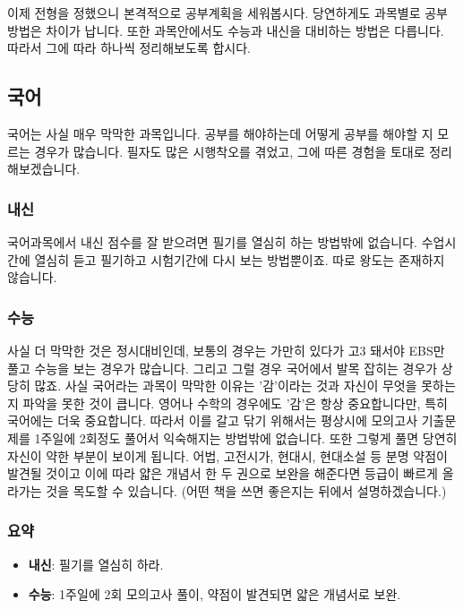 \documentclass[final]{IEEEphot}
\begin{document}
\hspace{0.3cm} 이제 전형을 정했으니 본격적으로 공부계획을 세워봅시다. 당연하게도 과목별로 공부방법은 차이가 납니다. 또한 과목안에서도 수능과 내신을 대비하는 방법은 다릅니다.
따라서 그에 따라 하나씩 정리해보도록 합시다.

\subsection{국어}

\hspace{0.3cm} 국어는 사실 매우 막막한 과목입니다. 공부를 해야하는데 어떻게 공부를 해야할 지 모르는 경우가 많습니다. 필자도 많은 시행착오를 겪었고, 그에 따른 경험을 토대로 
정리해보겠습니다.

\subsubsection{내신} 

국어과목에서 내신 점수를 잘 받으려면 필기를 열심히 하는 방법밖에 없습니다. 수업시간에 열심히 듣고 필기하고 시험기간에 다시 보는 방법뿐이죠.
따로 왕도는 존재하지 않습니다.

\subsubsection{수능}

\hspace{0.3cm} 사실 더 막막한 것은 정시대비인데, 보통의 경우는 가만히 있다가 고3 돼서야 EBS만 풀고 수능을 보는 경우가 많습니다. 그리고 그럴 경우 국어에서 발목 잡히는 경우가 상당히 많죠.
사실 국어라는 과목이 막막한 이유는 '감'이라는 것과 자신이 무엇을 못하는 지 파악을 못한 것이 큽니다. 영어나 수학의 경우에도 '감'은 항상 중요합니다만, 특히 국어에는 더욱 중요합니다. 따라서 이를 갈고 닦기 위해서는 평상시에
모의고사 기출문제를 1주일에 2회정도 풀어서 익숙해지는 방법밖에 없습니다. 또한 그렇게 풀면 당연히 자신이 약한 부분이 보이게 됩니다. 어법, 고전시가, 현대시, 현대소설 등 분명 약점이 발견될 것이고
이에 따라 얇은 개념서 한 두 권으로 보완을 해준다면 등급이 빠르게 올라가는 것을 목도할 수 있습니다. (어떤 책을 쓰면 좋은지는 뒤에서 설명하겠습니다.)

\subsubsection{요약}
\vspace{0.1cm}
\begin{itemize}
 \item \textbf{내신}: 필기를 열심히 하라. \vspace{0.1cm}
 \item \textbf{수능}: 1주일에 2회 모의고사 풀이, 약점이 발견되면 얇은 개념서로 보완.
\end{itemize}
\end{document}
